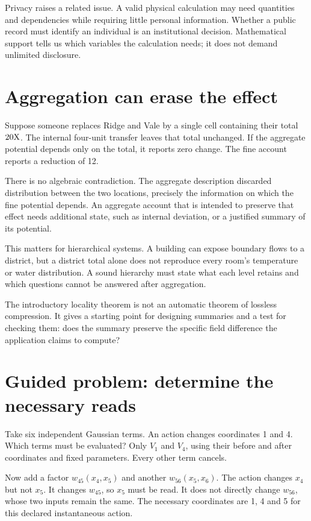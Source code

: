 Privacy raises a related issue. A valid physical calculation may need quantities and dependencies while requiring little personal information. Whether a public record must identify an individual is an institutional decision. Mathematical support tells us which variables the calculation needs; it does not demand unlimited disclosure.

\section{Aggregation can erase the effect}
Suppose someone replaces Ridge and Vale by a single cell containing their total $20\mathrm{X}$. The internal four-unit transfer leaves that total unchanged. If the aggregate potential depends only on the total, it reports zero change. The fine account reports a reduction of 12.

There is no algebraic contradiction. The aggregate description discarded distribution between the two locations, precisely the information on which the fine potential depends. An aggregate account that is intended to preserve that effect needs additional state, such as internal deviation, or a justified summary of its potential.

This matters for hierarchical systems. A building can expose boundary flows to a district, but a district total alone does not reproduce every room's temperature or water distribution. A sound hierarchy must state what each level retains and which questions cannot be answered after aggregation.

The introductory locality theorem is not an automatic theorem of lossless compression. It gives a starting point for designing summaries and a test for checking them: does the summary preserve the specific field difference the application claims to compute?

\section{Guided problem: determine the necessary reads}
Take six independent Gaussian terms. An action changes coordinates 1 and 4. Which terms must be evaluated? Only $V_1$ and $V_4$, using their before and after coordinates and fixed parameters. Every other term cancels.

Now add a factor $w_{45}(x_4,x_5)$ and another $w_{56}(x_5,x_6)$. The action changes $x_4$ but not $x_5$. It changes $w_{45}$, so $x_5$ must be read. It does not directly change $w_{56}$, whose two inputs remain the same. The necessary coordinates are 1, 4 and 5 for this declared instantaneous action.

